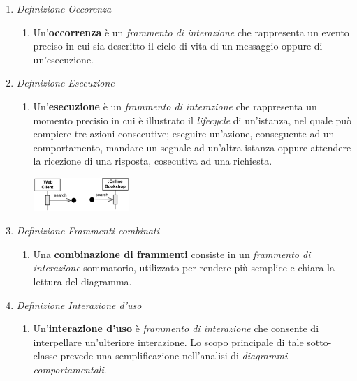 \documentclass{article}
\begin{document}
\begin{enumerate}
    \renewcommand{\labelenumi}{-}
    \itemsep0em
    \item \textit{Definizione Occorenza} \begin{enumerate}[label={ }]
                        \item Un'\textbf{occorrenza} è un \textit{frammento di interazione} che rappresenta un evento preciso in cui sia descritto il ciclo di vita di un messaggio oppure di un'esecuzione.
                    \end{enumerate}
    \item \textit{Definizione Esecuzione} \begin{enumerate}[label={ }]
                        \item Un'\textbf{esecuzione} è un \textit{frammento di interazione} che rappresenta un momento precisio in cui è illustrato il \textit{lifecycle} di un'istanza, nel quale può compiere tre azioni consecutive; eseguire un'azione, conseguente ad un comportamento, mandare un segnale ad un'altra istanza oppure attendere la ricezione di una risposta, cosecutiva ad una richiesta.
                        \begin{center}
                            \includegraphics[width=0.3\textwidth]{foto 9.png}\\
                        \end{center}
                     \end{enumerate}
    \item \textit{Definizione Frammenti combinati} \begin{enumerate}[label={ }]
                                \item Una \textbf{combinazione di frammenti} consiste in un \textit{frammento di interazione} sommatorio, utilizzato per rendere più semplice e chiara la lettura del diagramma. 
                              \end{enumerate}
    \item \textit{Definizione Interazione d'uso} \begin{enumerate}[label={ }]
                                \item Un'\textbf{interazione d'uso} è \textit{frammento di interazione} che consente di interpellare un'ulteriore interazione. Lo scopo principale di tale sotto-classe prevede una semplificazione nell'analisi di \textit{diagrammi comportamentali}.\vspace*{14pt}

\end{enumerate}
\end{enumerate}
\end{document}
